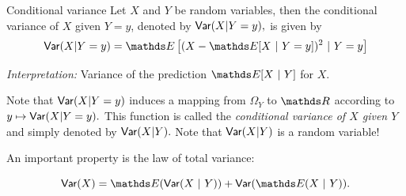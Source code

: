 \documentclass[11pt,compress,t,notes=noshow, xcolor=table]{beamer}
\begin{document}
\begin{frame}[t]{Conditional variance} 
	Let $X$ and $Y$ be random variables, then the conditional variance of $X$ given $Y=y$, denoted by $\mathsf{Var}(X|Y=y),$ is given by
	$$	\var(X|Y=y)  = \E \left[ (X - \E[X~|~Y=y])^2  ~|~ Y=y  \right]	$$
	
	\emph{Interpretation:} Variance of the prediction $\E[X~|~Y]$ for $X.$
	\lz
	
	Note that $\mathsf{Var}(X|Y=y)$ induces a mapping from $\Omega_Y$ to $\R$ according to $y \mapsto \mathsf{Var}(X|Y=y).$
	This function is called the \emph{conditional variance of $X$ given $Y$} and simply denoted by $\mathsf{Var}(X|Y).$
	Note that $\mathsf{Var}(X|Y)$ is a random variable!
	
	\lz
	
	An important property is the law of total variance:
	
	$$  \var(X) = \E(\var(X~|~Y)) + \var(\E(X~|~Y)).  $$

	
\end{frame}




\endlecture
\end{document}
